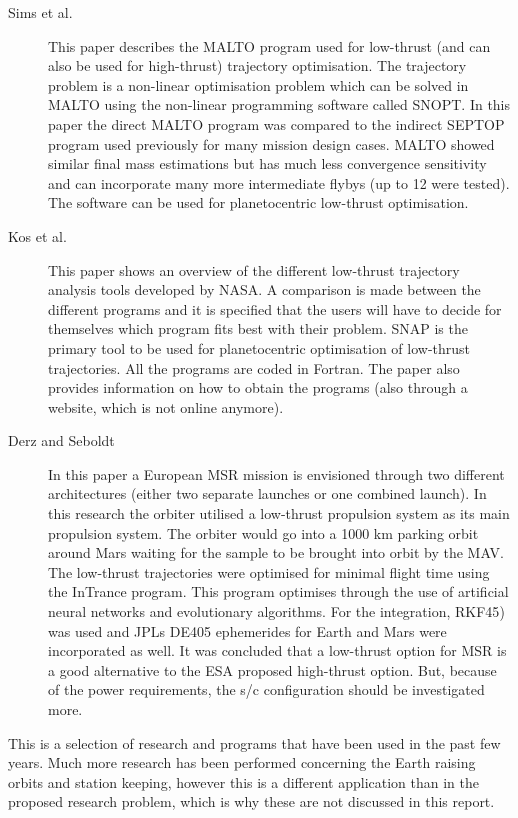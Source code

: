 \begin{description}
\item[Sims et al. \cite{sims2006implementation}] This paper describes the MALTO program used for low-thrust (and can also be used for high-thrust) trajectory optimisation. The trajectory problem is a non-linear optimisation problem which can be solved in MALTO using the non-linear programming software called SNOPT. In this paper the direct MALTO program was compared to the indirect SEPTOP program used previously for many mission design cases. MALTO showed similar final mass estimations but has much less convergence sensitivity and can incorporate many more intermediate flybys (up to 12 were tested). The software can be used for planetocentric low-thrust optimisation.
\item[Kos et al.  \cite{kos2006overview}] This paper shows an overview of the different low-thrust trajectory analysis tools developed by NASA. A comparison is made between the different programs and it is specified that the users will have to decide for themselves which program fits best with their problem. SNAP is the primary tool to be used for planetocentric optimisation of low-thrust trajectories. All the programs are coded in Fortran. The paper also provides information on how to obtain the programs (also through a website, which is not online anymore). 
\item[Derz and Seboldt \cite{derz2012mars}] In this paper a European \ac{MSR} mission is envisioned through two different architectures (either two separate launches or one combined launch). In this research the orbiter utilised a low-thrust propulsion system as its main propulsion system. The orbiter would go into a 1000 km parking orbit around Mars waiting for the sample to be brought into orbit by the \ac{MAV}. The low-thrust trajectories were optimised for minimal flight time using the InTrance program. This program optimises through the use of artificial neural networks and evolutionary algorithms. For the integration, \ac{RKF45}) was used and \ac{JPL}s DE405 ephemerides for Earth and Mars were incorporated as well. It was concluded that a low-thrust option for \ac{MSR} is a good alternative to the \ac{ESA} proposed high-thrust option. But, because of the power requirements, the \ac{s/c} configuration should be investigated more.
\end{description}



This is a selection of research and programs that have been used in the past few years. Much more research has been performed concerning the Earth raising orbits and station keeping, however this is a different application than in the proposed research problem, which is why these are not discussed in this report. 


